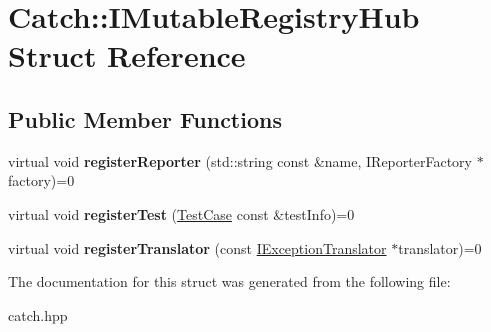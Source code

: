 \hypertarget{structCatch_1_1IMutableRegistryHub}{
\section{Catch::IMutableRegistryHub Struct Reference}
\label{structCatch_1_1IMutableRegistryHub}
}
\subsection*{Public Member Functions}
\begin{DoxyCompactItemize}
\item 
\hypertarget{structCatch_1_1IMutableRegistryHub_a1f61ed2b3f2d160b31a0f2c1d9a52af1}{
virtual void {\bfseries registerReporter} (std::string const \&name, IReporterFactory $\ast$factory)=0}
\label{structCatch_1_1IMutableRegistryHub_a1f61ed2b3f2d160b31a0f2c1d9a52af1}

\item 
\hypertarget{structCatch_1_1IMutableRegistryHub_a11b85c6744d88c9f83fe16ad4a8dd451}{
virtual void {\bfseries registerTest} (\hyperlink{classCatch_1_1TestCase}{TestCase} const \&testInfo)=0}
\label{structCatch_1_1IMutableRegistryHub_a11b85c6744d88c9f83fe16ad4a8dd451}

\item 
\hypertarget{structCatch_1_1IMutableRegistryHub_ae6825365102693cf7707db022a2c2b49}{
virtual void {\bfseries registerTranslator} (const \hyperlink{structCatch_1_1IExceptionTranslator}{IExceptionTranslator} $\ast$translator)=0}
\label{structCatch_1_1IMutableRegistryHub_ae6825365102693cf7707db022a2c2b49}

\end{DoxyCompactItemize}


The documentation for this struct was generated from the following file:\begin{DoxyCompactItemize}
\item 
catch.hpp\end{DoxyCompactItemize}
